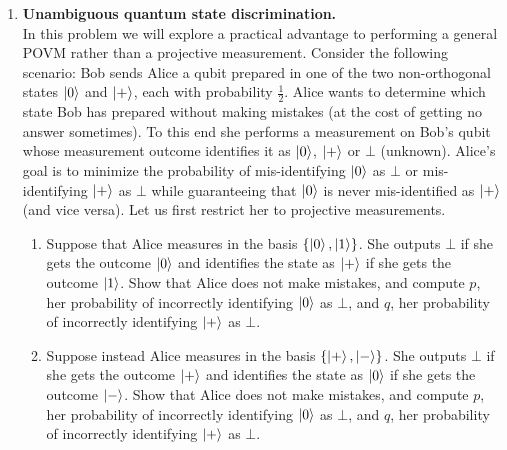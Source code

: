 \documentclass[12pt]{article}
\begin{document}
\begin{enumerate}
\item {\bf Unambiguous quantum state discrimination.}\\
In this problem we will explore a practical advantage to performing a general POVM rather than a projective measurement. Consider the following scenario: Bob sends Alice a qubit prepared in one of the two non-orthogonal states $\ket{0}$ and $\ket{+}$, each with probability $\frac{1}{2}$. Alice wants to determine which state Bob has prepared without making mistakes (at the cost of getting no answer sometimes). To this end she performs a measurement on Bob's qubit whose measurement outcome identifies it as $\ket{0}$, $\ket{+}$ or $\bot$ (unknown). Alice's goal is to minimize the probability of mis-identifying $\ket{0}$ as $\bot$ or mis-identifying $\ket{+}$ as $\bot$ while guaranteeing that $\ket{0}$ is never mis-identified as $\ket{+}$ (and vice versa). Let us first restrict her to projective measurements.
\begin{enumerate}
\item Suppose that Alice measures in the basis $\{\ket{0},\ket{1}\}$. She outputs $\bot$ if she gets the outcome $\ket{0}$ and identifies the state as $\ket{+}$ if she gets the outcome $\ket{1}$. Show that Alice does not make mistakes, and compute $p$, her probability of incorrectly identifying $\ket{0}$ as $\bot$, and $q$, her probability of incorrectly identifying $\ket{+}$ as $\bot$.
\item Suppose instead Alice measures in the basis $\{\ket{+},\ket{-}\}$. She outputs $\bot$ if she gets the outcome $\ket{+}$ and identifies the state as $\ket{0}$ if she gets the outcome $\ket{-}$. Show that Alice does not make mistakes, and compute $p$, her probability of incorrectly identifying $\ket{0}$ as $\bot$, and $q$, her probability of incorrectly identifying $\ket{+}$ as $\bot$.

\end{enumerate}
\end{enumerate}
\end{document}
